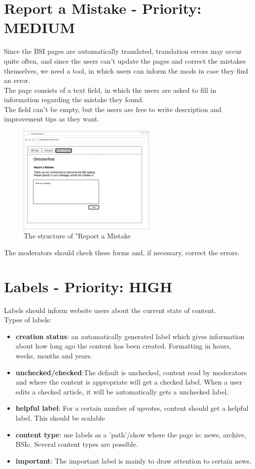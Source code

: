 \section{Report a Mistake  - Priority: MEDIUM}

Since the BSI pages are automatically translated, translation errors may occur quite often, and since the users can't update the pages and correct the mistakes themselves, we need a tool, in which users can inform the mods in case they find an error. \\
The page consists of a text field, in which the users are asked to fill in information regarding the mistake they found.\\
The field can't be empty, but the users are free to write description and improvement tips as they want.

\begin{figure}[h] 
    \centering
    \includegraphics[width=0.6\textwidth]{Pictures/report1.jpg}
    \caption{The structure of "Report a Mistake}
\end{figure} 

The moderators should check these forms and, if necessary, correct the errors.


\section{Labels - Priority: HIGH}
 
Labels should inform website users about the current state of content. 
\\
Types of labels:
\begin{itemize}
    \item \textbf{creation status}: an automatically generated label which gives information about how long ago the content has been created. Formatting in hours, weeks, months and years.
    \item \textbf{unchecked/checked}:The default is unchecked, content read by moderators and where the content is appropriate will get a checked label. When a user edits a checked article, it will be automatically gets a unchecked label. 
    \item \textbf{helpful label}: For a certain number of upvotes, content should get a helpful label. This should be scalable
    \item \textbf{content type}: use labels as a 'path'/show where the page is: news, archive, BSIc. Several content types are possible.
    \item \textbf{important}: The important label is mainly to draw attention to certain news.
\end{itemize}


